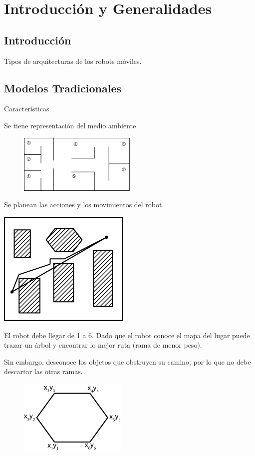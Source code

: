 \chapter{Introducción y Generalidades}

\section{Introducción}
Tipos de arquitecturas de los robots móviles.

\section{Modelos Tradicionales}
Características

Se tiene representación del medio ambiente

\begin{figure}[h!]
	\centering
	\includegraphics[width=0.5\textwidth]{images/img1.png}
	\label{figura1}
\end{figure}

Se planean las acciones y los movimientos del robot.

\begin{floatingfigure}[l]{2.5cm}
	\includegraphics[width = 2 cm]{images/img2.png}
	\label{figura2}
\end{floatingfigure}

El robot debe llegar de 1 a 6. Dado que el robot conoce el mapa del lugar puede trazar un árbol y encontrar lo mejor ruta (rama de menor peso).

Sin embargo, desconoce los objetos que obstruyen su camino; por lo que no debe descartar las otras ramas.\\


\begin{figure}[h]
\begin{floatingfigure}[l]{1cm}
	\includegraphics[width = 2.5 cm]{images/img3.png}
	\label{figura3}
\end{floatingfigure}	
\end{figure}


